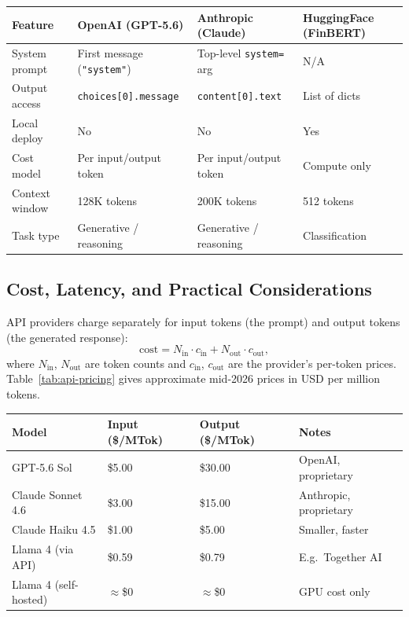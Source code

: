 \begin{context}
\begin{center}
\footnotesize
\begin{tabularx}{\linewidth}{l X X X}
\hline
\textbf{Feature} & \textbf{OpenAI (GPT-5.6)} & \textbf{Anthropic (Claude)} &
\textbf{HuggingFace (FinBERT)} \\
\hline
System prompt   & First message (\texttt{"system"}) & Top-level \texttt{system=} arg & N/A \\
Output access   & \texttt{choices[0].message}       & \texttt{content[0].text}        & List of dicts \\
Local deploy    & No  & No  & Yes \\
Cost model      & Per input/output token & Per input/output token & Compute only \\
Context window  & 128K tokens & 200K tokens & 512 tokens \\
Task type       & Generative / reasoning & Generative / reasoning & Classification \\
\hline
\end{tabularx}
\label{tab:api-comparison}
\end{center}

\subsection{Cost, Latency, and Practical Considerations}
\label{sec:api-practical}

API providers charge separately for input tokens (the prompt) and output tokens
(the generated response):
\begin{equation}
  \text{cost} = N_{\text{in}} \cdot c_{\text{in}} + N_{\text{out}} \cdot c_{\text{out}},
  \label{eq:cost-model}
\end{equation}
where $N_{\text{in}}$, $N_{\text{out}}$ are token counts and $c_{\text{in}}$,
$c_{\text{out}}$ are the provider's per-token prices.
Table~\ref{tab:api-pricing} gives approximate mid-2026 prices in USD per million tokens.

\begin{center}
\small
\begin{tabularx}{\linewidth}{l l l X}
\hline
\textbf{Model} & \textbf{Input (\$/MTok)} & \textbf{Output (\$/MTok)} &
\textbf{Notes} \\
\hline
GPT-5.6 Sol            & \$5.00       & \$30.00       & OpenAI, proprietary \\
Claude Sonnet 4.6      & \$3.00       & \$15.00       & Anthropic, proprietary \\
Claude Haiku 4.5       & \$1.00       & \$5.00        & Smaller, faster \\
Llama 4 (via API)      & \$0.59       & \$0.79        & E.g.\ Together AI \\
Llama 4 (self-hosted)  & $\approx$\$0 & $\approx$\$0  & GPU cost only \\
\hline
\end{tabularx}
\label{tab:api-pricing}
\end{center}


\end{context}
